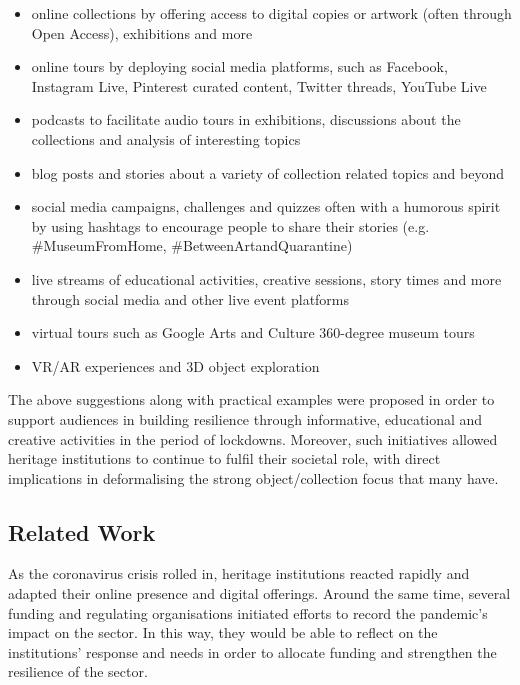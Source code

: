 \documentclass{egpubl}
\begin{document}
\begin{itemize}
\item online collections by offering access to digital copies or artwork (often through Open Access), exhibitions and more
  
\item online tours by deploying social media platforms, such as Facebook, Instagram Live, Pinterest curated content, Twitter threads, YouTube Live

\item podcasts to facilitate audio tours in exhibitions, discussions about the collections and analysis of interesting topics

\item blog posts and stories about a variety of collection related topics and beyond

\item social media campaigns, challenges and quizzes often with a humorous spirit by using hashtags to encourage people to share their stories (e.g. \#MuseumFromHome, \#BetweenArtandQuarantine)

\item live streams of educational activities, creative sessions, story times and more through social media and other live event platforms

\item virtual tours such as Google Arts and Culture 360-degree museum tours

\item VR/AR experiences and 3D object exploration

\end{itemize}

The above suggestions along with practical examples were proposed in order to support audiences in building resilience through informative, educational and creative activities in the period of lockdowns. Moreover, such initiatives allowed heritage institutions to continue to fulfil their societal role, with direct implications in deformalising the strong object/collection focus that many have.


\subsection{Related Work}
\label{rel}
As the coronavirus crisis rolled in, heritage institutions reacted rapidly and adapted their online presence and digital offerings. Around the same time, several funding and regulating organisations initiated efforts to record the pandemic's impact on the sector. In this way, they would be able to reflect on the institutions' response and needs in order to allocate funding and strengthen the resilience of the sector.
\end{document}
